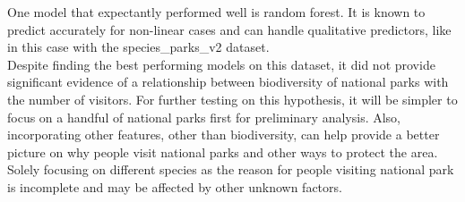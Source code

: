 \documentclass[stu, floatsintext, 11pt]{apa7}
\begin{document}
One model that expectantly performed well is random forest. It is known to predict accurately for non-linear cases and can handle qualitative predictors, like in this case with the species\_parks\_v2 dataset. \\

Despite finding the best performing models on this dataset, it did not provide significant evidence of a relationship between biodiversity of national parks with the number of visitors. For further testing on this hypothesis, it will be simpler to focus on a handful of national parks first for preliminary analysis. Also, incorporating other features, other than biodiversity, can help provide a better picture on why people visit national parks and other ways to protect the area. Solely focusing on different species as the reason for people visiting national park is incomplete and may be affected by other unknown factors.

\printbibliography
\end{document}
